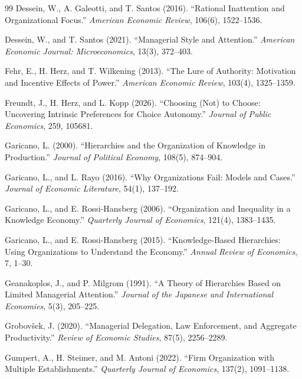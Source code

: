 \documentclass[11pt,a4paper]{article}
\theoremstyle{plain}
\begin{document}
\begin{thebibliography}{99}
Dessein, W., A. Galeotti, and T. Santos (2016). ``Rational Inattention and Organizational Focus.'' \emph{American Economic Review}, 106(6), 1522--1536.

Dessein, W., and T. Santos (2021). ``Managerial Style and Attention.'' \emph{American Economic Journal: Microeconomics}, 13(3), 372--403.

Fehr, E., H. Herz, and T. Wilkening (2013). ``The Lure of Authority: Motivation and Incentive Effects of Power.'' \emph{American Economic Review}, 103(4), 1325--1359.

Freundt, J., H. Herz, and L. Kopp (2026). ``Choosing (Not) to Choose: Uncovering Intrinsic Preferences for Choice Autonomy.'' \emph{Journal of Public Economics}, 259, 105681.

Garicano, L. (2000). ``Hierarchies and the Organization of Knowledge in Production.'' \emph{Journal of Political Economy}, 108(5), 874--904.

Garicano, L., and L. Rayo (2016). ``Why Organizations Fail: Models and Cases.'' \emph{Journal of Economic Literature}, 54(1), 137--192.

Garicano, L., and E. Rossi-Hansberg (2006). ``Organization and Inequality in a Knowledge Economy.'' \emph{Quarterly Journal of Economics}, 121(4), 1383--1435.

Garicano, L., and E. Rossi-Hansberg (2015). ``Knowledge-Based Hierarchies: Using Organizations to Understand the Economy.'' \emph{Annual Review of Economics}, 7, 1--30.

Geanakoplos, J., and P. Milgrom (1991). ``A Theory of Hierarchies Based on Limited Managerial Attention.'' \emph{Journal of the Japanese and International Economies}, 5(3), 205--225.

Grobov\v{s}ek, J. (2020). ``Managerial Delegation, Law Enforcement, and Aggregate Productivity.'' \emph{Review of Economic Studies}, 87(5), 2256--2289.

Gumpert, A., H. Steimer, and M. Antoni (2022). ``Firm Organization with Multiple Establishments.'' \emph{Quarterly Journal of Economics}, 137(2), 1091--1138.


\end{thebibliography}
\end{document}
